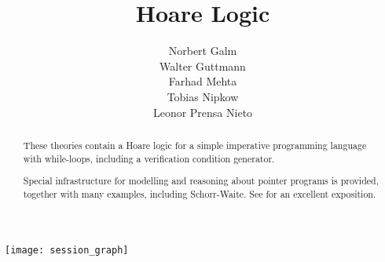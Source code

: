 \documentclass[11pt,a4paper]{article}
\begin{document}
\title{Hoare Logic}
\author{
  Norbert Galm \\
  Walter Guttmann \\
  Farhad Mehta \\
  Tobias Nipkow \\
  Leonor Prensa Nieto}
\maketitle

\begin{abstract}
These theories contain a Hoare logic for a simple imperative
programming language with while-loops, including a verification
condition generator.

Special infrastructure for modelling and reasoning about pointer
programs is provided, together with many examples, including Schorr-Waite.
See \cite{MehtaN-CADE03,MehtaN-IC05} for an excellent exposition.
\end{abstract}

\pagestyle{plain}
\thispagestyle{empty}
\tableofcontents

\begin{center}
  \texttt{[image: session\_graph]}
\end{center}

\clearpage





\end{document}
